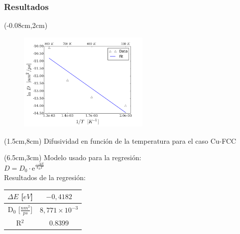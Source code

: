 \begin{frame}
 \frametitle{Resultados}
 
  \begin{textblock*}{6.5cm}(-0.08cm,2cm) 
   \begin{figure}[htp]
    \centering
    \includegraphics[width=6.3cm]{../Figures/Cap_4/FCCDiff_vs_temp_fit.png}
   \end{figure}
  \end{textblock*}
  \begin{textblock*}{10cm}(1.5cm,8cm) 
    \centering
    Difusividad en funci\'on de la temperatura para el caso Cu-FCC
  \end{textblock*}
  
  \begin{textblock*}{6cm}(6.5cm,3cm)
    Modelo usado para la regresi\'on: \\
    $D = D_{0}\cdot \mathrm{e}^{\frac{-\Delta E}{k_{B} T}}$\\
    \vspace{0.5cm}
    Resultados de la regresi\'on:
    \begin{table}[htp]
      \begin{center}
      \begin{tabular}{*{2}{c}}
      \hline
      $\Delta E$ [$eV$]& $-0,4182$ \\
      \hline
      D$_{0}$ [$\frac{nm^{2}}{ps}$] & $8,771\times 10^{-3}$\\
      \hline
      R$^{2}$ & 0.8399 \\
      \hline
      \end{tabular}
      \end{center}
      \end{table}    
  \end{textblock*} 
\end{frame}

